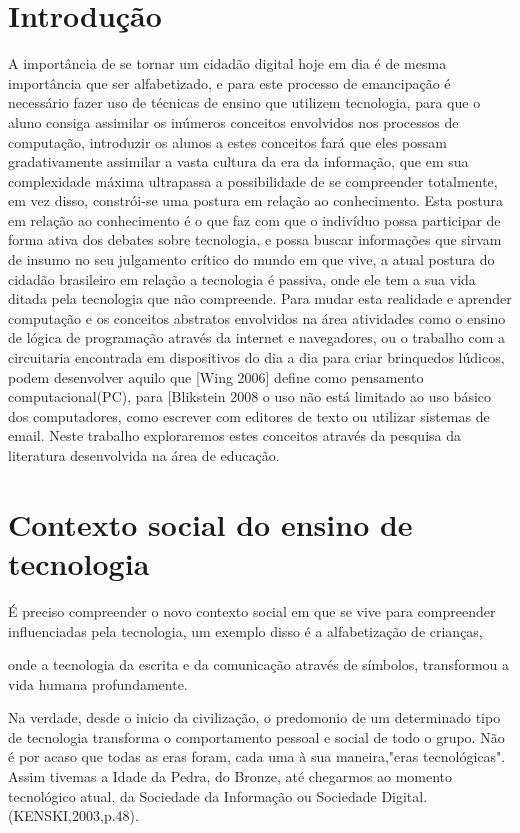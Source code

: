 \documentclass[article, 11pt, oneside, a4paper, english, brazil, sumario=tradicional]{abntex2}
\begin{document}
\section{Introdução}
    A importância de se tornar um cidadão digital hoje em dia é de mesma importância
que ser alfabetizado, e para este processo de emancipação é necessário fazer uso
de técnicas de ensino que utilizem tecnologia, para que o aluno consiga assimilar
os inúmeros conceitos envolvidos nos processos de computação, introduzir os
alunos a estes conceitos fará que eles possam gradativamente assimilar a vasta
cultura da era da informação,  que em sua complexidade máxima ultrapassa a
possibilidade de se compreender totalmente, em vez disso, constrói-se uma
postura em relação ao conhecimento. Esta postura em relação ao conhecimento é o
que faz com que o indivíduo possa participar de forma ativa dos debates sobre
tecnologia, e possa buscar informações que sirvam de insumo no seu julgamento
crítico do mundo em que vive, a atual postura do cidadão brasileiro em relação a
tecnologia é passiva, onde ele tem a sua vida ditada pela tecnologia que não
compreende.
    Para mudar esta realidade e aprender computação e os conceitos abstratos
envolvidos na área atividades como o ensino de lógica de programação através
da internet e navegadores, ou o trabalho com a circuitaria encontrada em
dispositivos do dia a dia para criar brinquedos lúdicos, podem desenvolver aquilo
que [Wing 2006] define como pensamento computacional(PC), para [Blikstein 2008 o uso não
está limitado ao uso básico dos computadores, como escrever com editores de texto ou utilizar sistemas
de email.
    Neste trabalho exploraremos estes conceitos através da pesquisa da literatura
desenvolvida na área de educação.

\section{Contexto social do ensino de tecnologia}
    É preciso compreender o novo contexto social em que se vive para compreender
influenciadas pela tecnologia, um exemplo disso é a alfabetização de crianças,

onde a tecnologia da escrita e da comunicação através de símbolos, transformou a
vida humana profundamente.

\begin{citacao}
Na verdade, desde o inicio da civilização, o predomonio de um determinado tipo
de tecnologia transforma o comportamento pessoal e social de todo o grupo. Não é
por acaso que todas as eras foram, cada uma à sua maneira,"eras tecnológicas".
Assim tivemas a Idade da Pedra, do Bronze, até chegarmos ao momento tecnológico
atual, da Sociedade da Informação ou Sociedade Digital. (KENSKI,2003,p.48).
\end{citacao}
\end{document}
